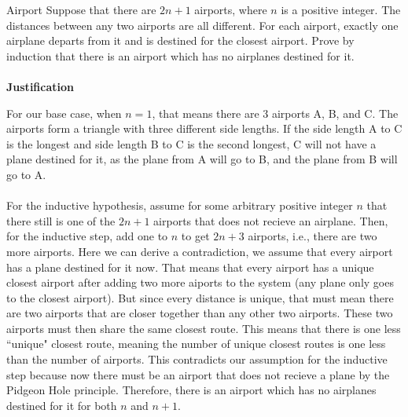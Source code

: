\begin{homeworkProblem}{Airport}
    Suppose that there are $2n + 1$ airports, where $n$ is a positive integer. The distances between any two airports are all different. For each airport, exactly one airplane departs from it and is destined for the closest airport. Prove by induction that there is an airport which has no airplanes destined for it.
    \\ \\
    \textbf{Justification}
    
    For our base case, when $n=1$, that means there are 3 airports A, B, and C. The airports form a triangle with three different side lengths. If the side length A to C is the longest and side length B to C is the second longest, C will not have a plane destined for it, as the plane from A will go to B, and the plane from B will go to A.
    \\ \\
    For the inductive hypothesis, assume for some arbitrary positive integer $n$ that there still is one of the $2n+1$ airports that does not recieve an airplane. Then, for the inductive step, add one to $n$ to get $2n+3$ airports, i.e., there are two more airports. Here we can derive a contradiction, we assume that every airport has a plane destined for it now. That means that every airport has a unique closest airport after adding two more aiports to the system (any plane only goes to the closest airport). But since every distance is unique, that must mean there are two airports that are closer together than any other two airports. These two airports must then share the same closest route. This means that there is one less ``unique" closest route, meaning the number of unique closest routes is one less than the number of airports. This contradicts our assumption for the inductive step because now there must be an airport that does not recieve a plane by the Pidgeon Hole principle. Therefore, there is an airport which has no airplanes destined for it for both $n$ and $n+1$.
\end{homeworkProblem}

